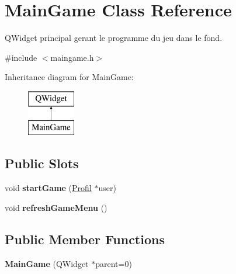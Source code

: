 \hypertarget{class_main_game}{}\section{Main\+Game Class Reference}
\label{class_main_game}


Q\+Widget principal gerant le programme du jeu dans le fond.  




{\ttfamily \#include $<$maingame.\+h$>$}

Inheritance diagram for Main\+Game\+:\begin{figure}[H]
\begin{center}
\leavevmode
\includegraphics[height=2.000000cm]{class_main_game}
\end{center}
\end{figure}
\subsection*{Public Slots}
\begin{DoxyCompactItemize}
\item 
\hypertarget{class_main_game_aab3b497b7d0de1bcc87175895f477a9c}{}void {\bfseries start\+Game} (\hyperlink{class_profil}{Profil} $\ast$user)\label{class_main_game_aab3b497b7d0de1bcc87175895f477a9c}

\item 
\hypertarget{class_main_game_a21e0447f9ff6eeaa12d8abbd7c34aafe}{}void {\bfseries refresh\+Game\+Menu} ()\label{class_main_game_a21e0447f9ff6eeaa12d8abbd7c34aafe}

\end{DoxyCompactItemize}
\subsection*{Public Member Functions}
\begin{DoxyCompactItemize}
\item 
\hypertarget{class_main_game_aba77e63bf031bc452693ba06986affe6}{}{\bfseries Main\+Game} (Q\+Widget $\ast$parent=0)\label{class_main_game_aba77e63bf031bc452693ba06986affe6}

\end{DoxyCompactItemize}


